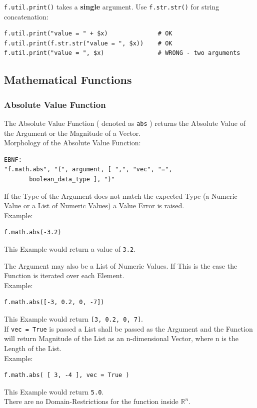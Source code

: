 \texttt{f.util.print()} takes a \textbf{single} argument. Use \texttt{f.str.str()} for string concatenation:
\begin{verbatim}
f.util.print("value = " + $x)              # OK
f.util.print(f.str.str("value = ", $x))    # OK
f.util.print("value = ", $x)               # WRONG - two arguments
\end{verbatim}

\subsection{Mathematical Functions}
\subsubsection{Absolute Value Function}
The Absolute Value Function ( denoted as \texttt{abs} ) returns the Absolute Value of the Argument or the Magnitude of a Vector. \\
Morphology of the Absolute Value Function:
\begin{verbatim}
EBNF:
"f.math.abs", "(", argument, [ ",", "vec", "=", 
       boolean_data_type ], ")"
\end{verbatim}
If the Type of the Argument does not match the expected Type (a Numeric Value or a List of Numeric Values) a Value Error is raised.\\
Example:
\begin{verbatim}
f.math.abs(-3.2)
\end{verbatim}
This Example would return a value of \texttt{3.2}.

The Argument may also be a List of Numeric Values. If This is the case the Function is iterated over each Element.\\
Example:
\begin{verbatim}
f.math.abs([-3, 0.2, 0, -7])
\end{verbatim}
This Example would return \texttt{[3, 0.2, 0, 7]}. \vspace{5 mm}\\
If \texttt{vec = True} is passed a List shall be passed as the Argument and the Function will return Magnitude of the List as an n-dimensional Vector, where n is the Length of the List.\\ %
Example:
\begin{verbatim}
f.math.abs( [ 3, -4 ], vec = True )
\end{verbatim}
This Example would return \texttt{5.0}.\\
There are no Domain-Restrictions for the function inside $\mathbb{R}^n$.

